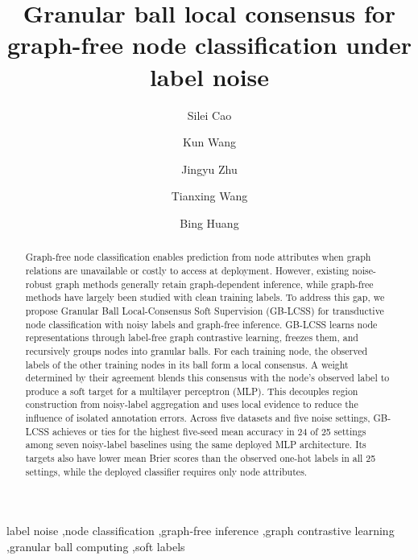 \documentclass[10pt,letterpaper,nopreprintline]{elsarticle}
\theoremstyle{plain}
\begin{document}
\SetAlgoNoLine
\begin{frontmatter}
\title{Granular ball local consensus for graph-free node classification under label noise}
\author[a]{Silei Cao}
\author[a]{Kun Wang}
\author[b]{Jingyu Zhu}
\author[c]{Tianxing Wang}
\author[a]{Bing Huang}
\address[a]{School of Computer Science, Nanjing Audit University, Nanjing 211815, PR China}
\address[b]{School of Statistics and Data Science, Nanjing Audit University, Nanjing 211815, PR China}
\address[c]{School of Business, Nanjing Audit University, Nanjing 211815, PR China}
\begin{abstract}
Graph-free node classification enables prediction from node attributes when graph relations are unavailable or costly to access at deployment. However, existing noise-robust graph methods generally retain graph-dependent inference, while graph-free methods have largely been studied with clean training labels. To address this gap, we propose Granular Ball Local-Consensus Soft Supervision (GB-LCSS) for transductive node classification with noisy labels and graph-free inference. GB-LCSS learns node representations through label-free graph contrastive learning, freezes them, and recursively groups nodes into granular balls. For each training node, the observed labels of the other training nodes in its ball form a local consensus. A weight determined by their agreement blends this consensus with the node's observed label to produce a soft target for a multilayer perceptron (MLP). This decouples region construction from noisy-label aggregation and uses local evidence to reduce the influence of isolated annotation errors. Across five datasets and five noise settings, GB-LCSS achieves or ties for the highest five-seed mean accuracy in 24 of 25 settings among seven noisy-label baselines using the same deployed MLP architecture. Its targets also have lower mean Brier scores than the observed one-hot labels in all 25 settings, while the deployed classifier requires only node attributes.
\end{abstract}
\begin{keyword}
label noise \sep node classification \sep graph-free inference \sep graph contrastive learning \sep granular ball computing \sep soft labels
\end{keyword}
\end{frontmatter}
\end{document}
